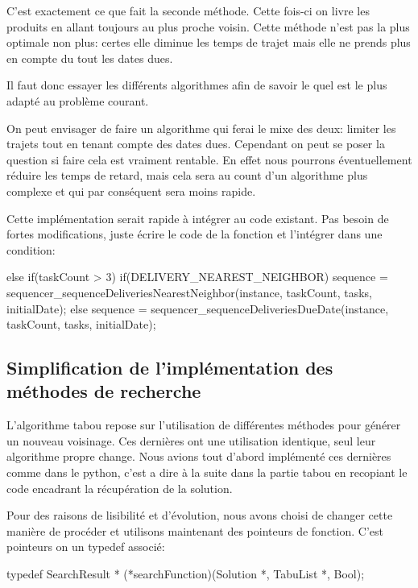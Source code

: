 \documentclass[hideweeklyreports]{polytech/polytech}
\begin{document}
				C'est exactement ce que fait la seconde méthode. Cette fois-ci on livre les produits en allant toujours au plus proche voisin. Cette méthode n'est pas la plus optimale non plus: certes elle diminue les temps de trajet mais elle ne prends plus en compte du tout les dates dues.
				
				Il faut donc essayer les différents algorithmes afin de savoir le quel est le plus adapté au problème courant.
				
				On peut envisager de faire un algorithme qui ferai le mixe des deux: limiter les trajets tout en tenant compte des dates dues. Cependant on peut se poser la question si faire cela est vraiment rentable. En effet nous pourrons éventuellement réduire les temps de retard, mais cela sera au count d'un algorithme plus complexe et qui par conséquent sera moins rapide.
				
				Cette implémentation serait rapide à intégrer au code existant. Pas besoin de fortes modifications, juste écrire le code de la fonction et l'intégrer dans une condition:
				\begin{csource}
else if(taskCount > 3)
{
	if(DELIVERY_NEAREST_NEIGHBOR)
		sequence = sequencer_sequenceDeliveriesNearestNeighbor(instance, taskCount, tasks, initialDate);
	else
		sequence = sequencer_sequenceDeliveriesDueDate(instance, taskCount, tasks, initialDate);
}
				\end{csource} 
				
			\subsection{\label{searchfunc}Simplification de l'implémentation des méthodes de recherche}
				L'algorithme tabou repose sur l'utilisation de différentes méthodes pour générer un nouveau voisinage. Ces dernières ont une utilisation identique, seul leur algorithme propre change. Nous avions tout d'abord implémenté ces dernières comme dans le python, c'est a dire à la suite dans la partie tabou en recopiant le code encadrant la récupération de la solution.
				
				Pour des raisons de lisibilité et d'évolution, nous avons choisi de changer cette manière de procéder et utilisons maintenant des pointeurs de fonction. C'est pointeurs on un typedef associé:
				\begin{csource}
typedef SearchResult * (*searchFunction)(Solution *, TabuList *, Bool);
				\end{csource}
			
\end{document}
